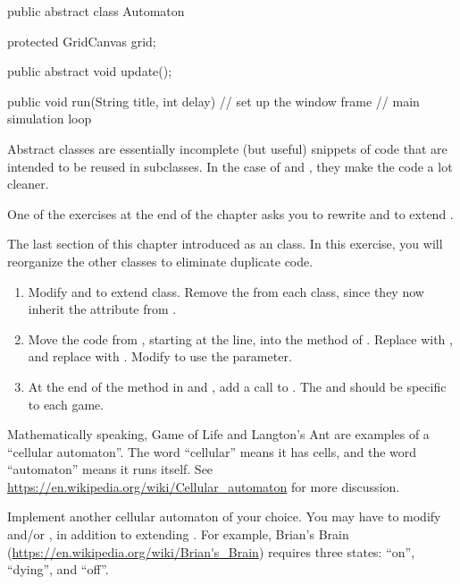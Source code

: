\begin{code}
public abstract class Automaton {
    protected GridCanvas grid;

    public abstract void update();

    public void run(String title, int delay) {
        // set up the window frame
        // main simulation loop
    }
}
\end{code}

Abstract classes are essentially incomplete (but useful) snippets of code that are intended to be reused in subclasses.
In the case of  and , they make the code a lot cleaner.

One of the exercises at the end of the chapter asks you to rewrite  and  to extend .



\begin{exercise}
The last section of this chapter introduced  as an  class.
In this exercise, you will reorganize the other classes to eliminate duplicate code.

\begin{enumerate}

\item Modify  and  to extend  class.
Remove the  from each class, since they now inherit the  attribute from .

\item Move the code from , starting at the  line, into the  method of .
Replace  with , and replace  with .
Modify  to use the  parameter.

\item At the end of the  method in  and , add a call to .
The  and  should be specific to each game.

\end{enumerate}

\end{exercise}


\begin{exercise}
Mathematically speaking, Game of Life and Langton's Ant are examples of a ``cellular automaton''.
The word ``cellular'' means it has cells, and the word ``automaton'' means it runs itself.
See \url{https://en.wikipedia.org/wiki/Cellular_automaton} for more discussion.

Implement another cellular automaton of your choice.
You may have to modify  and/or , in addition to extending .
For example, Brian's Brain (\url{https://en.wikipedia.org/wiki/Brian's_Brain}) requires three states: ``on'', ``dying'', and ``off''.
\end{exercise}
